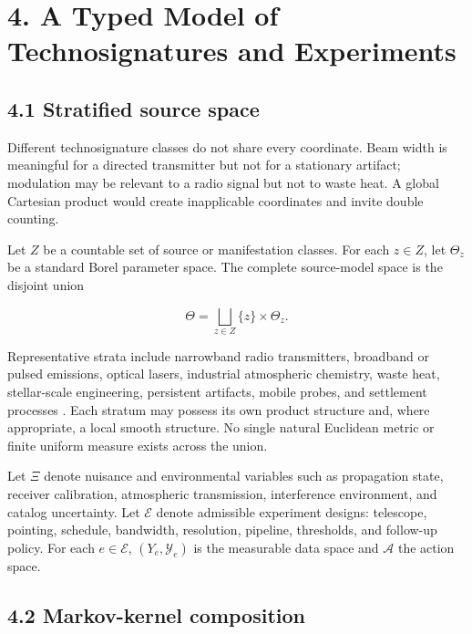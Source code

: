 \documentclass[11pt,a4paper]{article}
\begin{document}
\section{4. A Typed Model of Technosignatures and Experiments}\label{4-a-typed-model-of-technosignatures-and-experiments}

\subsection{4.1 Stratified source space}\label{41-stratified-source-space}

Different technosignature classes do not share every coordinate. Beam width is meaningful for a directed transmitter but not for a stationary artifact; modulation may be relevant to a radio signal but not to waste heat. A global Cartesian product would create inapplicable coordinates and invite double counting.

Let \(Z\) be a countable set of source or manifestation classes. For each \(z\in Z\), let \(\Theta_z\) be a standard Borel parameter space. The complete source-model space is the disjoint union

\begin{equation}
\Theta = \bigsqcup_{z\in Z}\{z\}\times\Theta_z.
\end{equation}

Representative strata include narrowband radio transmitters, broadband or pulsed emissions, optical lasers, industrial atmospheric chemistry, waste heat, stellar-scale engineering, persistent artifacts, mobile probes, and settlement processes \citep{wright2014}. Each stratum may possess its own product structure and, where appropriate, a local smooth structure. No single natural Euclidean metric or finite uniform measure exists across the union.

Let \(\Xi\) denote nuisance and environmental variables such as propagation state, receiver calibration, atmospheric transmission, interference environment, and catalog uncertainty. Let \(\mathcal E\) denote admissible experiment designs: telescope, pointing, schedule, bandwidth, resolution, pipeline, thresholds, and follow-up policy. For each \(e\in\mathcal E\), \((Y_e,\mathcal Y_e)\) is the measurable data space and \(\mathcal A\) the action space.

\subsection{4.2 Markov-kernel composition}\label{42-markov-kernel-composition}
\end{document}
